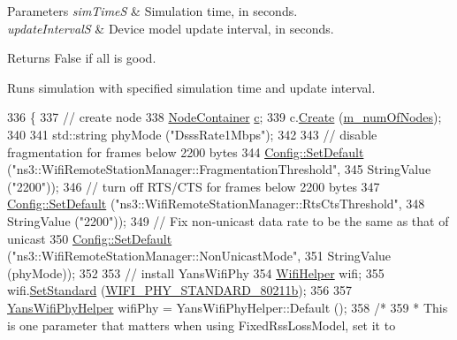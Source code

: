 \begin{DoxyParams}{Parameters}
{\em sim\+TimeS} & Simulation time, in seconds. \\
\hline
{\em update\+IntervalS} & Device model update interval, in seconds. \\
\hline
\end{DoxyParams}
\begin{DoxyReturn}{Returns}
False if all is good.
\end{DoxyReturn}
Runs simulation with specified simulation time and update interval. 
\begin{DoxyCode}
336 \{
337   \textcolor{comment}{// create node}
338   \hyperlink{classns3_1_1NodeContainer}{NodeContainer} \hyperlink{lte_2model_2fading-traces_2fading__trace__generator_8m_ae0323a9039add2978bf5b49550572c7c}{c};
339   c.\hyperlink{classns3_1_1NodeContainer_a787f059e2813e8b951cc6914d11dfe69}{Create} (\hyperlink{classBasicEnergyDepletionTest_a80ec49961c2a9652f8648a3e5fe6b6fa}{m\_numOfNodes});
340 
341   std::string phyMode (\textcolor{stringliteral}{"DsssRate1Mbps"});
342 
343   \textcolor{comment}{// disable fragmentation for frames below 2200 bytes}
344   \hyperlink{group__config_ga2e7882df849d8ba4aaad31c934c40c06}{Config::SetDefault} (\textcolor{stringliteral}{"ns3::WifiRemoteStationManager::FragmentationThreshold"},
345                       StringValue (\textcolor{stringliteral}{"2200"}));
346   \textcolor{comment}{// turn off RTS/CTS for frames below 2200 bytes}
347   \hyperlink{group__config_ga2e7882df849d8ba4aaad31c934c40c06}{Config::SetDefault} (\textcolor{stringliteral}{"ns3::WifiRemoteStationManager::RtsCtsThreshold"},
348                       StringValue (\textcolor{stringliteral}{"2200"}));
349   \textcolor{comment}{// Fix non-unicast data rate to be the same as that of unicast}
350   \hyperlink{group__config_ga2e7882df849d8ba4aaad31c934c40c06}{Config::SetDefault} (\textcolor{stringliteral}{"ns3::WifiRemoteStationManager::NonUnicastMode"},
351                       StringValue (phyMode));
352 
353   \textcolor{comment}{// install YansWifiPhy}
354   \hyperlink{classns3_1_1WifiHelper}{WifiHelper} wifi;
355   wifi.\hyperlink{classns3_1_1WifiHelper_aa54f3e61527ef8de318d310045bc5dfd}{SetStandard} (\hyperlink{group__wifi_gga1299834f4e1c615af3ca738033b76a49a77e1cc9f77a0bce8e2bc82cbef437b5a}{WIFI\_PHY\_STANDARD\_80211b});
356 
357   \hyperlink{classns3_1_1YansWifiPhyHelper}{YansWifiPhyHelper} wifiPhy =  YansWifiPhyHelper::Default ();
358   \textcolor{comment}{/*}
359 \textcolor{comment}{   * This is one parameter that matters when using FixedRssLossModel, set it to}

\end{DoxyCode}
